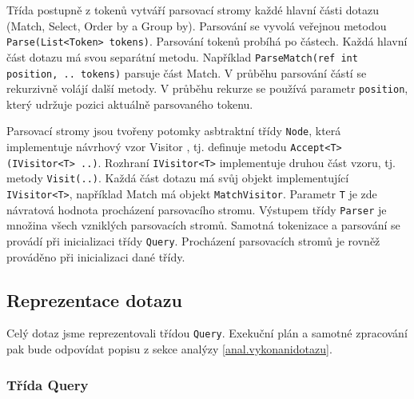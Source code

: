 Třída postupně z tokenů vytváří parsovací stromy každé hlavní části dotazu (Match, Select, Order by a Group by).
Parsování se vyvolá veřejnou metodou \texttt{Parse(List<Token> tokens)}.
Parsování tokenů probíhá po částech.
Každá hlavní část dotazu má svou separátní metodu.
Například \texttt{ParseMatch(ref int position, .. tokens)} parsuje část Match. 
V průběhu parsování částí se rekurzivně volájí další metody.
V průběhu rekurze se používá parametr \texttt{position}, který udržuje pozici aktuálně parsovaného tokenu.

Parsovací stromy jsou tvořeny potomky asbtraktní třídy \texttt{Node}, která implementuje návrhový vzor Visitor \citep[str. 331]{patterns}, tj. definuje metodu \texttt{Accept<T>(IVisitor<T> ..)}.
Rozhraní \texttt{IVisitor<T>} implementuje druhou část vzoru, tj. metody \texttt{Visit(..)}.
Každá část dotazu má svůj objekt implementující \texttt{IVisitor<T>}, například Match má objekt \texttt{MatchVisitor}.
Parametr \texttt{T} je zde návratová hodnota procházení parsovacího stromu.
Výstupem třídy \texttt{Parser} je množina všech vzniklých parsovacích stromů.
Samotná tokenizace a parsování se provádí při inicializaci třídy \texttt{Query}.
Procházení parsovacích stromů je rovněž prováděno při inicializaci dané třídy.

\subsection{Reprezentace dotazu}
Celý dotaz jsme reprezentovali třídou \texttt{Query}.
Exekuční plán a samotné zpracování pak bude odpovídat popisu z sekce analýzy \ref{anal.vykonanidotazu}.

\subsubsection{Třída Query}


